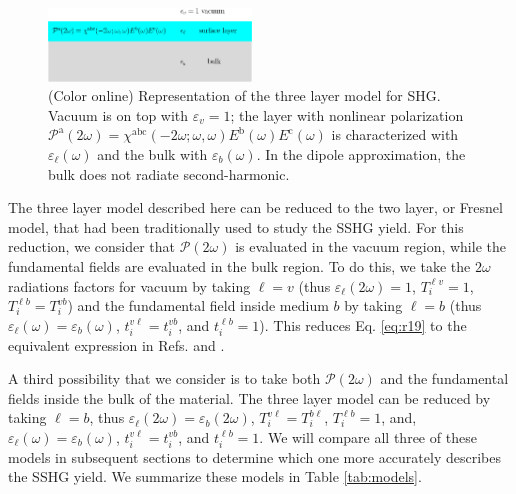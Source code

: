 \documentclass[prb,superscriptaddress,showpacs,twocolumn,letterpaper]{revtex4}
\begin{document}
\begin{figure}[t]
\centering
\includegraphics[width=0.48\textwidth]{fig1}
\caption{(Color online) Representation of the three layer model for SHG. 
Vacuum is on top with $\varepsilon_{v}=1$; the layer with nonlinear polarization
$\mathcal{P}^{\mathrm{a}}(2\omega) =
\chi^{\mathrm{abc}}(-2\omega;\omega,\omega)
E^{\mathrm{b}}(\omega)E^{\mathrm{c}}(\omega)$ is characterized with
$\varepsilon_{\ell}(\omega)$ and the bulk with $\varepsilon_{b}(\omega)$. In the
dipole approximation, the bulk does not radiate
second-harmonic.\label{fig:3layer}}
\end{figure}

The three layer model described here can be reduced to the two
layer,\cite{mizrahiJOSA88, sipePRB87} or Fresnel model,\cite{bloembergenPR62}
that had been traditionally used to study the SSHG yield. For this reduction, we
consider that $\boldsymbol{\mathcal{P}}(2\omega)$ is evaluated in the vacuum
region, while the fundamental fields are evaluated in the bulk region. To do
this, we take the $2\omega$ radiations factors for vacuum by taking $\ell=v$
(thus $\varepsilon_{\ell}(2\omega)=1$, $T^{\ell v}_{i}=1$, $T^{\ell
b}_{i}=T^{vb}_{i}$) and the fundamental field inside medium $b$ by taking
$\ell=b$ (thus $\varepsilon_{\ell}(\omega)=\varepsilon_{b}(\omega)$,
$t^{v\ell}_{i}=t^{vb}_{i}$, and $t^{\ell b}_{i}=1$). This reduces Eq.
\eqref{eq:r19} to the equivalent expression in Refs. 
and .

A third possibility that we consider is to take both
$\boldsymbol{\mathcal{P}}(2\omega)$ and the fundamental fields inside the bulk
of the material. The three layer model can be reduced by taking $\ell=b$, thus
$\varepsilon_{\ell}(2\omega)=\varepsilon_{b}(2\omega)$,
$T^{v\ell}_{i}=T^{b\ell}_{i}$, $T^{\ell b}_{i}=1$, and,
$\varepsilon_{\ell}(\omega)=\varepsilon_{b}(\omega)$,
$t^{v\ell}_{i}=t^{vb}_{i}$, and $t^{\ell b}_{i}=1$. We will compare all three of
these models in subsequent sections to determine which one more accurately
describes the SSHG yield. We summarize these models in Table \ref{tab:models}.
\end{document}
